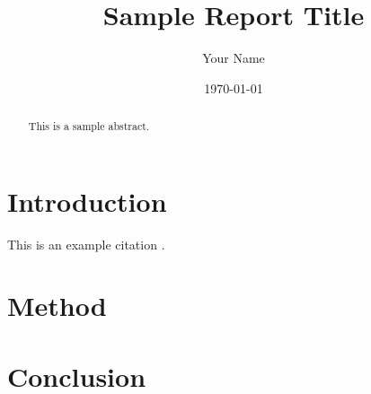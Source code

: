 \documentclass[conference]{IEEEtran}
\title{Sample Report Title}
\author{Your Name}
\date{\today}
\begin{document}
\maketitle

\begin{abstract}
This is a sample abstract.
\end{abstract}

\section{Introduction}
This is an example citation \cite{smith2023}.

\section{Method}

\section{Conclusion}



\end{document}
